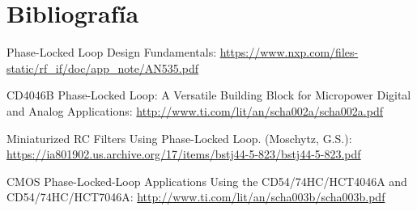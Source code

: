 \section{Bibliografía}
Phase-Locked Loop Design Fundamentals: \url{https://www.nxp.com/files-static/rf_if/doc/app_note/AN535.pdf}

CD4046B Phase-Locked Loop: A Versatile Building
Block for Micropower Digital and Analog Applications: \url{http://www.ti.com/lit/an/scha002a/scha002a.pdf}

Miniaturized RC Filters Using Phase-Locked Loop. (Moschytz, G.S.): \url{https://ia801902.us.archive.org/17/items/bstj44-5-823/bstj44-5-823.pdf}

CMOS Phase-Locked-Loop Applications Using the
CD54/74HC/HCT4046A and CD54/74HC/HCT7046A: \url{http://www.ti.com/lit/an/scha003b/scha003b.pdf}


